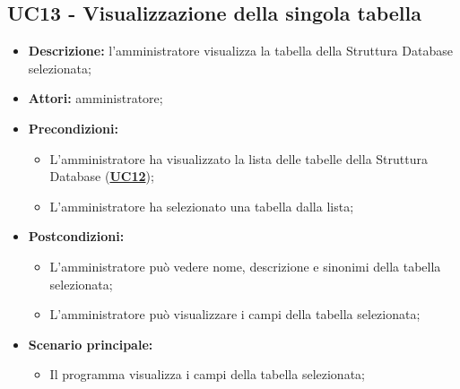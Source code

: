 \subsection{UC13 - Visualizzazione della singola tabella}
\label{sec:UC13}
\begin{itemize}
	\item \textbf{Descrizione:} l’amministratore visualizza la tabella della Struttura Database selezionata;
	\item \textbf{Attori:} amministratore;
	\item \textbf{Precondizioni:} 
	\begin{itemize}
		\item L'amministratore ha visualizzato la lista delle tabelle della Struttura Database (\hyperref[sec:UC12]{\textbf{UC12}});
		\item L'amministratore ha selezionato una tabella dalla lista;
	\end{itemize}
	\item \textbf{Postcondizioni:} 
	\begin{itemize}
		\item L'amministratore può vedere nome, descrizione e sinonimi della tabella selezionata;
		\item L'amministratore può visualizzare i campi della tabella selezionata;
	\end{itemize}
	\item \textbf{Scenario principale:} 
	\begin{itemize}
		\item Il programma visualizza i campi della tabella selezionata;
	\end{itemize}
\end{itemize}

